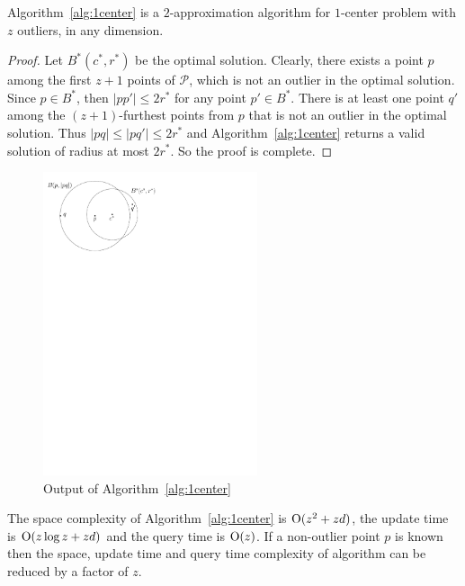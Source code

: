\documentclass[envcountsame]{cls/cccg15}
\newcommand{\cO}{\ensuremath{{\rm O}}}
\newcommand{\card}[1]{\left|{#1}\right|}
\newcommand{\lee}{\leqslant}
\renewcommand{\le}{\lee}
\begin{document}
\begin{theorem}
Algorithm~\ref{alg:1center} is a $2$-approximation algorithm for $1$-center problem with $z$ outliers, in any dimension.
\end{theorem}

\begin{proof}
Let $B^*(c^*, r^*)$ be the optimal solution. Clearly, there exists a point $p$ among the first $z+1$ points of $\mathcal{P}$, which is not an outlier in the optimal solution. Since $p \in B^*$, then $\card{pp'} \le 2r^*$ for any point $p'\in B^*$. There is at least one point $q'$ among the $(z+1)$-furthest points from $p$ that is not an outlier in the optimal solution. Thus $\card{pq} \le \card{pq'} \le 2r^*$ and Algorithm~\ref{alg:1center} returns a valid solution of radius at most $2r^*$. So the proof is complete.
\end{proof}

\begin{figure}[h]
	\centering
	\includegraphics[width=17em]{figs/one-center}
	\caption{Output of Algorithm~\ref{alg:1center}}
	\label{fig:1center}
\end{figure}


The space complexity of Algorithm~\ref{alg:1center} is $\cO(z^2 + zd)$, the update time is $\cO (z \log z + zd)$ and the query time is $\cO (z)$.
If a non-outlier point $p$ is known then the space, update time and query time complexity of algorithm can be reduced by a factor of $z$.



\end{document}
